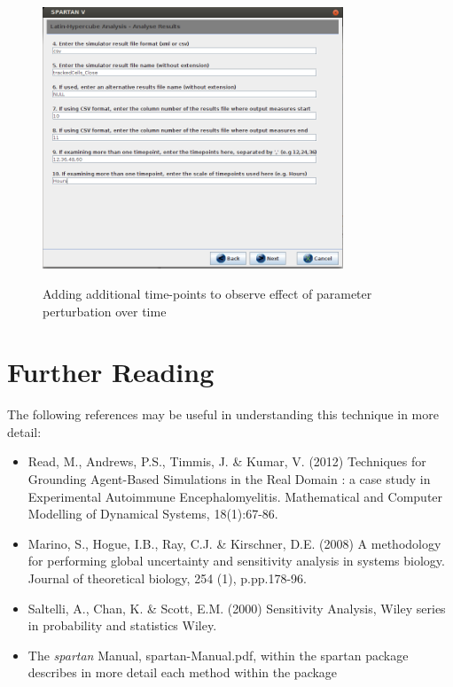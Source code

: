\documentclass[a4paper,11pt]{article}
\begin{document}
\begin{figure}
\centering
    \includegraphics[width=0.8\textwidth]{SpartanV_LHC6.png}\\ \noindent
    \caption{Adding additional time-points to observe effect of parameter perturbation over time}
    \label{LHC_Screen6}
    \newpage 
\end{figure}


\section{Further Reading}
\noindent
The following references may be useful in understanding this technique in more detail:
\begin{itemize}
\item Read, M., Andrews, P.S., Timmis, J. \& Kumar, V. (2012) Techniques for Grounding Agent-Based Simulations in the Real Domain : a case study in Experimental Autoimmune Encephalomyelitis. Mathematical and Computer Modelling of Dynamical Systems, 18(1):67-86.
\item Marino, S., Hogue, I.B., Ray, C.J. \& Kirschner, D.E. (2008) A methodology for performing global uncertainty and sensitivity analysis in systems biology. Journal of theoretical biology, 254 (1), p.pp.178-96.
\item Saltelli, A., Chan, K. \& Scott, E.M. (2000) Sensitivity Analysis, Wiley series in probability and statistics Wiley.
\item The \textit{spartan} Manual, spartan-Manual.pdf, within the spartan package describes in more detail each method within the package
\end{itemize}
\end{document}
